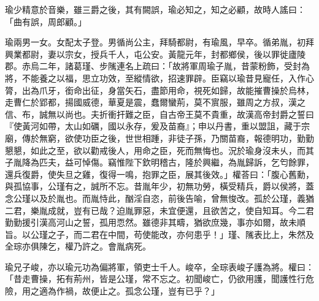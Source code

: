 \begin{pinyinscope}
 
 
 
 瑜少精意於音樂，雖三爵之後，其有闕誤，瑜必知之，知之必顧，故時人謠曰：「曲有誤，周郎顧。」
 
 
 
 
 瑜兩男一女。女配太子登。男循尚公主，拜騎都尉，有瑜風，早卒。循弟胤，初拜興業都尉，妻以宗女，授兵千人，屯公安。黃龍元年，封都鄉侯，後以罪徙廬陵郡。赤烏二年，諸葛瑾、步隲連名上疏曰：「故將軍周瑜子胤，昔蒙粉飾，受封為將，不能養之以福，思立功效，至縱情欲，招速罪辟。臣竊以瑜昔見寵任，入作心膂，出為爪牙，銜命出征，身當矢石，盡節用命，視死如歸，故能摧曹操於烏林，走曹仁於郢都，揚國威德，華夏是震，蠢爾蠻荊，莫不賔服，雖周之方叔，漢之信、布，誠無以尚也。夫折衝扞難之臣，自古帝王莫不貴重，故漢高帝封爵之誓曰『使黃河如帶，太山如礪，國以永存，爰及苗裔』；申以丹書，重以盟詛，藏于宗廟，傳於無窮，欲使功臣之後，世世相踵，非徒子孫，乃關苗裔，報德明功，勤勤懇懇，如此之至，欲以勸戒後人，用命之臣，死而無悔也。況於瑜身沒未乆，而其子胤降為匹夫，益可悼傷。竊惟陛下欽明稽古，隆於興繼，為胤歸訴，乞匄餘罪，還兵復爵，使失旦之雞，復得一鳴，抱罪之臣，展其後效。」權荅曰：「腹心舊勳，與孤協事，公瑾有之，誠所不忘。昔胤年少，初無功勞，橫受精兵，爵以侯將，蓋念公瑾以及於胤也。而胤恃此，酗淫自恣，前後告喻，曾無悛改。孤於公瑾，義猶二君，樂胤成就，豈有已哉？迫胤罪惡，未宜便還，且欲苦之，使自知耳。今二君勤勤援引漢高河山之誓，孤用恧然。雖德非其疇，猶欲庶幾，事亦如爾，故未順旨。以公瑾之子，而二君在中間，苟使能改，亦何患乎！」瑾、隲表比上，朱然及全琮亦俱陳乞，權乃許之。會胤病死。
 
 
 
 
 瑜兄子峻，亦以瑜元功為偏將軍，領吏士千人。峻卒，全琮表峻子護為將。權曰：「昔走曹操，拓有荊州，皆是公瑾，常不忘之。初聞峻亡，仍欲用護，聞護性行危險，用之適為作禍，故便止之。孤念公瑾，豈有已乎？」
 
 
\end{pinyinscope}